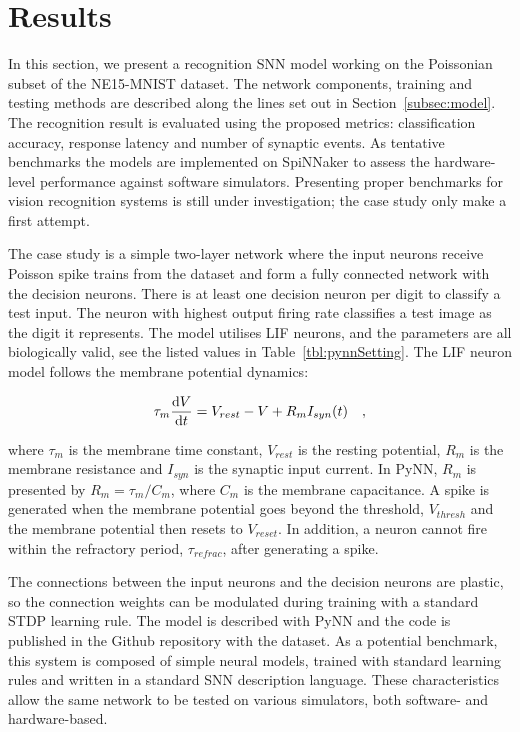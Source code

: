 \section{Results}
\label{sec:test}
In this section, we present a recognition SNN model working on the Poissonian subset of the NE15-MNIST dataset.
The network components, training and testing methods are described along the lines set out in Section~\ref{subsec:model}.
The recognition result is evaluated using the proposed metrics: classification accuracy, response latency and number of synaptic events.
As tentative benchmarks the models are implemented on SpiNNaker to assess the hardware-level performance against software simulators.
Presenting proper benchmarks for vision recognition systems is still under investigation; the case study only make a first attempt.

The case study is a simple two-layer network where the input neurons receive Poisson spike trains from the dataset and form a fully connected network with the decision neurons.
There is at least one decision neuron per digit to classify a test input.
The neuron with highest output firing rate classifies a test image as the digit it represents.
The model utilises LIF neurons, and the parameters are all biologically valid, see the listed values in Table~\ref{tbl:pynnSetting}.
The LIF neuron model follows the membrane potential dynamics:

\begin{equation}
\tau_m \frac{\mathrm{d} V}{\mathrm{d} t}=V_{rest} - V + R_{m} I_{syn}(t) ~~~,
\label{eq:LIF}
\end{equation}

where $\tau_m$ is the membrane time constant, $ V_{rest} $ is the resting potential, $ R_{m} $ is the membrane resistance and $ I_{syn} $ is the synaptic input current.
In PyNN, $ R_{m} $ is presented by $ R_{m}=\tau_m/C_{m} $, where $C_{m} $ is the membrane capacitance.
A spike is generated when the membrane potential goes beyond the threshold, $ V_{thresh} $ and the membrane potential then resets to $V_{reset}$.
In addition, a neuron cannot fire within the refractory period, $ \tau_{refrac} $, after generating a spike.

The connections between the input neurons and the decision neurons are plastic, so the connection weights can be modulated during training with a standard STDP learning rule.
The model is described with PyNN and the code is published in
the Github repository with the dataset.
As a potential benchmark, this system is composed of simple neural models, trained with standard learning rules and written in a standard SNN description language. These characteristics allow the same network to be tested on various simulators, both software- and hardware-based.

